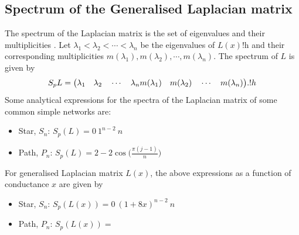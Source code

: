 \documentclass[10pt,a4paper]{article}
\begin{document}
        \subsection{Spectrum of the Generalised Laplacian matrix}
        The spectrum of the Laplacian matrix is the set of eigenvalues and their multiplicities \cite{estrada2011epidemic}. Let $\lambda_1 < \lambda_2 < \cdots < \lambda_n$ be the eigenvalues of $L(x)$!h and their corresponding multiplicities $m(\lambda_1), m(\lambda_2), \cdots, m(\lambda_n)$. The spectrum of $L$ is given by
        \begin{equation}
        S_p L = \big(\lambda_1 \quad \lambda_2 \quad \cdots \quad \lambda_n \\
        m(\lambda_1) \quad m(\lambda_2) \quad \cdots \quad m(\lambda_n)  \big).!h
        \end{equation}
        Some analytical expressions for the spectra of the Laplacian matrix of some common simple networks are:\\
        \begin{itemize}
        	\item Star, $S_n$: $S_p(L) = {0~ 1^{n-2}~ n}$\\
        	\item Path, $P_n$: $S_p(L) = {2-2\cos\big( \frac{\pi(j-1)}{n}\big) }$
        \end{itemize}
        For generalised Laplacian matrix $L(x)$, the above expressions as a function of conductance $x$ are given by
        \begin{itemize}
        	\item Star, $S_n$: $S_p(L(x)) = {0~ (1+8x)^{n-2}~ n}$\\
        	\item Path, $P_n$: $S_p(L(x)) = { }$
        \end{itemize}
\end{document}
